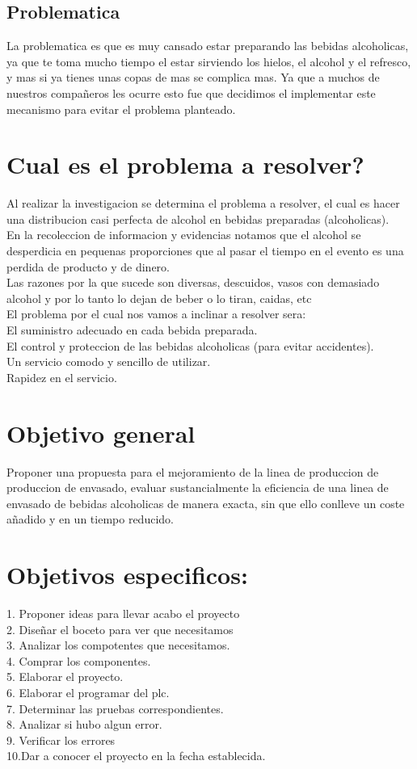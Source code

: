 \documentclass[12pt,a4paper]{report}
\begin{document}
\subsection{Problematica}
La problematica es que es muy cansado estar preparando las bebidas alcoholicas, ya que te toma mucho tiempo el estar sirviendo los hielos, el alcohol y el refresco, y mas si ya tienes unas copas de mas se complica mas.
Ya que a muchos de nuestros compañeros les ocurre esto fue que decidimos el implementar este mecanismo para evitar el problema planteado.

\section{Cual es el problema a resolver?}
Al realizar la investigacion se determina el problema a resolver, el cual es hacer una distribucion casi perfecta de alcohol en bebidas preparadas (alcoholicas).\\
En la recoleccion de informacion y evidencias notamos que el alcohol se desperdicia en pequenas proporciones que al pasar el tiempo en el evento es una perdida de producto y de dinero.\\
Las razones por la que sucede son diversas, descuidos, vasos con demasiado alcohol y por lo tanto lo dejan de beber o lo tiran, caidas, etc\\El problema por el cual nos vamos a inclinar a resolver sera:\\El suministro adecuado en cada bebida preparada.\\El control y proteccion de las bebidas alcoholicas (para evitar accidentes).\\Un servicio comodo y sencillo de utilizar.\\Rapidez en el servicio.


\section{Objetivo general}
Proponer una propuesta para el mejoramiento de la linea de produccion de produccion de envasado, evaluar sustancialmente la eficiencia de una linea de envasado de bebidas alcoholicas de manera exacta, sin que ello conlleve un coste añadido y en un tiempo reducido.

\section{Objetivos especificos:}
1. Proponer ideas para llevar acabo el proyecto\\2. Diseñar el boceto para ver que necesitamos\\3. Analizar los compotentes que necesitamos.\\4. Comprar los componentes.\\5. Elaborar el proyecto.\\6. Elaborar el programar del plc.\\7. Determinar las pruebas correspondientes.\\8. Analizar si hubo algun error.\\9. Verificar los errores\\10.Dar a conocer el proyecto en la fecha establecida.
\end{document}
